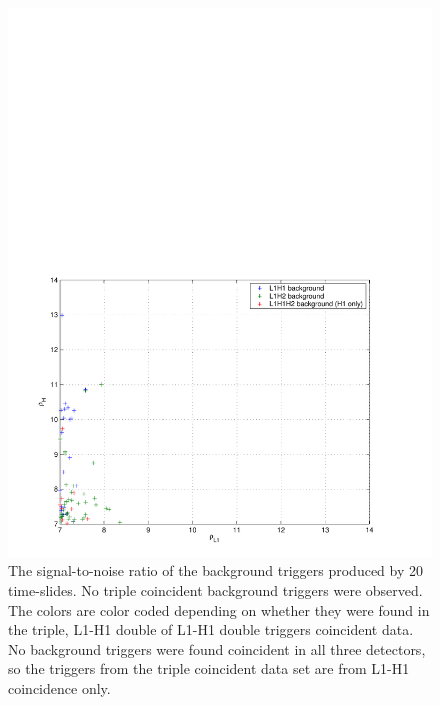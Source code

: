 \begin{figure}[p]
\begin{center}
\includegraphics[width=\textwidth]{figures/result/bkg}
\end{center}
\caption[Background Triggers from 20 Time Slides]{%
\label{f:bkg}%
The signal-to-noise ratio of the background triggers produced by 20
time-slides. No triple coincident background triggers were observed.
The colors are color coded depending on whether they were found in the triple,
L1-H1 double of L1-H1 double triggers coincident data. No background triggers 
were found coincident in all three detectors, so the triggers from the triple
coincident data set are from L1-H1 coincidence only.
}
\end{figure}

